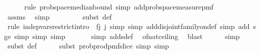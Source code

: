 \begin{isabellebody}
\ \ \ \ \isamarkupfalse%
\ {\isacharparenleft}{\kern0pt}rule\ prob{\isacharunderscore}{\kern0pt}space{\isachardot}{\kern0pt}median{\isacharunderscore}{\kern0pt}bound{\isacharunderscore}{\kern0pt}{}{\isacharcomma}{\kern0pt}\ simp\ add{\isacharcolon}{\kern0pt}prob{\isacharunderscore}{\kern0pt}space{\isacharunderscore}{\kern0pt}measure{\isacharunderscore}{\kern0pt}pmf{\isacharparenright}{\kern0pt}\isanewline
\ \ \ \ \ \ \ \isamarkupfalse%
\ assms\ \isamarkupfalse%
\ simp\ \isanewline
\ \ \ \ \ \ \isamarkupfalse%
\ {\isacharparenleft}{\kern0pt}subst\ {\isasymOmega}def{\isacharparenright}{\kern0pt}\isanewline
\ \ \ \ \ \ \isamarkupfalse%
\ {\isacharparenleft}{\kern0pt}rule\ indep{\isacharunderscore}{\kern0pt}vars{\isacharunderscore}{\kern0pt}restrict{\isacharunderscore}{\kern0pt}intro\ {\isacharbrackleft}{\kern0pt}\ f{\isacharequal}{\kern0pt}{\isachardoublequoteopen}{\isasymlambda}j{\isachardot}{\kern0pt}\ {\isacharbraceleft}{\kern0pt}j{\isacharbraceright}{\kern0pt}{\isachardoublequoteclose}{\isacharbrackright}{\kern0pt}{\isacharcomma}{\kern0pt}\ simp{\isacharcomma}{\kern0pt}\ simp\ add{\isacharcolon}{\kern0pt}disjoint{\isacharunderscore}{\kern0pt}family{\isacharunderscore}{\kern0pt}on{\isacharunderscore}{\kern0pt}def{\isacharcomma}{\kern0pt}\ simp\ add{\isacharcolon}{\kern0pt}\ s{\isacharunderscore}{\kern0pt}ge{\isacharunderscore}{\kern0pt}{}{\isacharcomma}{\kern0pt}\ simp{\isacharcomma}{\kern0pt}\ simp{\isacharcomma}{\kern0pt}\ simp{\isacharparenright}{\kern0pt}\isanewline
\ \ \ \ \ \isamarkupfalse%
\ {\isacharparenleft}{\kern0pt}simp\ add{\isacharcolon}{\kern0pt}s{\isacharunderscore}{\kern0pt}def{\isacharparenright}{\kern0pt}\ \isamarkupfalse%
\ of{\isacharunderscore}{\kern0pt}nat{\isacharunderscore}{\kern0pt}ceiling\ \isamarkupfalse%
\ blast\isanewline
\ \ \ \ \isamarkupfalse%
\ simp\isanewline
\ \ \ \ \isamarkupfalse%
\ {\isacharparenleft}{\kern0pt}subst\ {\isasymOmega}def{\isacharparenright}{\kern0pt}\isanewline
\ \ \ \ \isamarkupfalse%
\ {\isacharparenleft}{\kern0pt}subst\ prob{\isacharunderscore}{\kern0pt}prod{\isacharunderscore}{\kern0pt}pmf{\isacharunderscore}{\kern0pt}slice{\isacharcomma}{\kern0pt}\ simp{\isacharcomma}{\kern0pt}\ simp{\isacharparenright}{\kern0pt}\isanewline
\ \ \ \ \isamarkupfalse%

\end{isabellebody}
